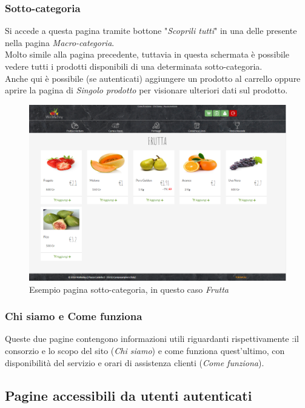 	\subsubsection{Sotto-categoria}
	Si accede a questa pagina tramite bottone "\textit{Scoprili tutti}" in una delle  presente nella pagina \textit{Macro-categoria}.\\
	Molto simile alla pagina precedente, tuttavia in questa schermata è possibile vedere tutti i prodotti disponibili di una determinata sotto-categoria.\\
	Anche qui è possibile (se autenticati) aggiungere un prodotto al carrello oppure aprire la pagina di \textit{Singolo prodotto} per visionare ulteriori dati sul prodotto.
	\begin{figure}[H]
		\includegraphics[width=\linewidth]{res/img/sotto-cat}
		\caption{Esempio pagina sotto-categoria, in questo caso \textit{Frutta}}
		\label{Pagina Sotto-categoria}
	\end{figure}

	\subsubsection{Chi siamo e Come funziona}
	Queste due pagine contengono informazioni utili riguardanti rispettivamente :il consorzio e lo scopo del sito (\textit{Chi siamo}) e come funziona quest'ultimo, con disponibilità del servizio e orari di assistenza clienti (\textit{Come funziona}).

\subsection{Pagine accessibili da utenti autenticati}
